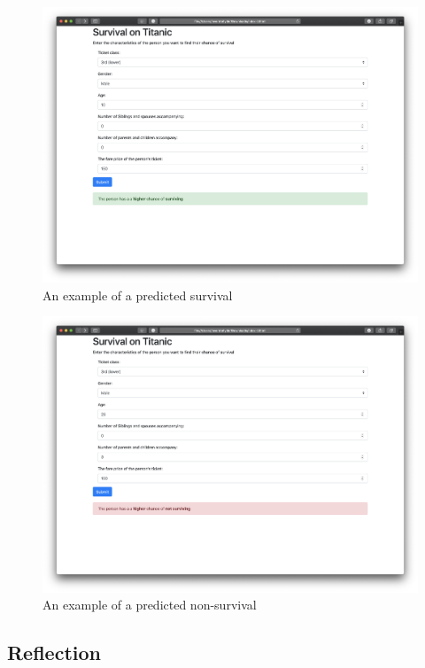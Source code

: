 \documentclass{article}
\begin{document}
\begin{figure}[H]
    \includegraphics[width=\linewidth]{web_app_survive}
    \caption{An example of a predicted survival}
    \label{fig: free-form-plot}
\end{figure}

\begin{figure}[H]
    \includegraphics[width=\linewidth]{web_app_not_survive}
    \caption{An example of a predicted non-survival}
    \label{fig: free-form-plot}
\end{figure}

\subsection{Reflection}\label{reflection}
\end{document}
